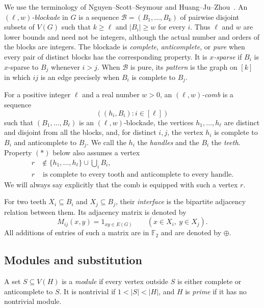 \documentclass[11pt]{article}
\numberwithin{equation}{section}
\theoremstyle{plain}
\theoremstyle{definition}
\begin{document}
We use the terminology of Nguyen--Scott--Seymour and
Huang--Ju--Zhou~\cite{HuangJuZhou2026,NguyenScottSeymourDensityIV}.
An \emph{$(\ell,w)$-blockade} in $G$ is a sequence
$\mathcal B=(B_1,\ldots,B_k)$ of pairwise disjoint subsets of $V(G)$
such that $k\geq\ell$ and $|B_i|\geq w$ for every $i$.  Thus $\ell$
and $w$ are lower bounds and need not be integers, although the actual
number and orders of the blocks are integers.  The blockade is
\emph{complete}, \emph{anticomplete}, or \emph{pure} when every pair
of distinct blocks has the corresponding property.  It is
\emph{$x$-sparse} if $B_i$ is $x$-sparse to $B_j$ whenever $i>j$.
When $\mathcal B$ is pure, its \emph{pattern} is the graph on $[k]$ in
which $ij$ is an edge precisely when $B_i$ is complete to $B_j$.

For a positive integer $\ell$ and a real number $w>0$, an
\emph{$(\ell,w)$-comb} is a sequence
\[
                     ((h_i,B_i):i\in[\ell])
\]
such that $(B_1,\ldots,B_\ell)$ is an $(\ell,w)$-blockade, the
vertices $h_1,\ldots,h_\ell$ are distinct and disjoint from all the
blocks, and, for distinct $i,j$, the vertex $h_i$ is complete to
$B_i$ and anticomplete to $B_j$.  We call the $h_i$ the
\emph{handles} and the $B_i$ the \emph{teeth}.  Property $(*)$ below
also assumes a vertex
\begin{equation}
 \begin{split}
 r&\notin\{h_1,\ldots,h_\ell\}\cup\bigcup_iB_i,\\
 r&\text{ is complete to every tooth and anticomplete to every handle.}
 \end{split}
 \label{eq:root-outside}
\end{equation}
We will always say explicitly that the comb is equipped with such a
vertex $r$.

For two teeth $X_i\subseteq B_i$ and $X_j\subseteq B_j$, their
\emph{interface} is the bipartite adjacency relation between them.  Its
adjacency matrix is denoted by
\[
       M_{ij}(x,y)=1_{xy\in E(G)}\qquad
       (x\in X_i,\ y\in X_j).
\]
All additions of entries of such a matrix are in $\mathbb F_2$ and are
denoted by $\oplus$.

\subsection{Modules and substitution}

A set $S\subseteq V(H)$ is a \emph{module} if every vertex outside
$S$ is either complete or anticomplete to $S$.  It is nontrivial if
$1<|S|<|H|$, and $H$ is \emph{prime} if it has no nontrivial module.
\end{document}
